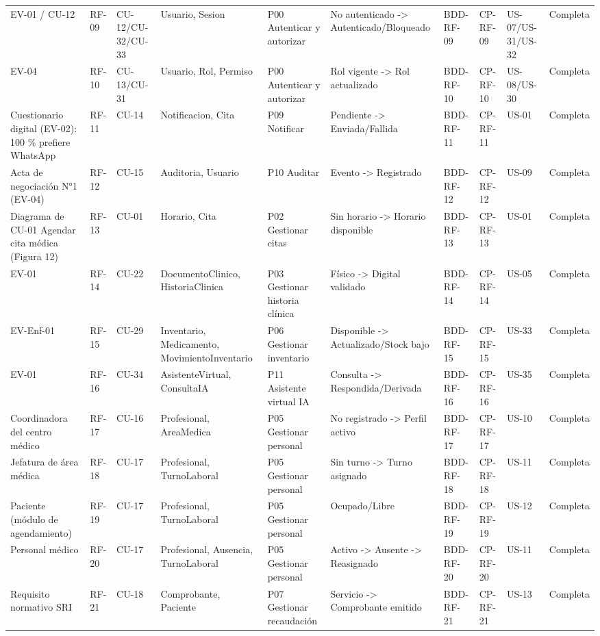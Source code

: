\documentclass[11pt,a4paper]{article}
\begin{document}
\begin{appendices}
\begin{landscape}
\begin{longtable}{p{2.2cm}p{1.8cm}p{2cm}p{3cm}p{3cm}p{3cm}p{2cm}p{2cm}p{2cm}p{1.6cm}}
			EV-01 / CU-12 & RF-09 & CU-12/CU-32/CU-33 & Usuario, Sesion & P00 Autenticar y autorizar & No autenticado -> Autenticado/Bloqueado & BDD-RF-09 & CP-RF-09 & US-07/US-31/US-32 & Completa\\
			EV-04 & RF-10 & CU-13/CU-31 & Usuario, Rol, Permiso & P00 Autenticar y autorizar & Rol vigente -> Rol actualizado & BDD-RF-10 & CP-RF-10 & US-08/US-30 & Completa\\
			Cuestionario digital (EV-02): 100 \% prefiere WhatsApp & RF-11 & CU-14 & Notificacion, Cita & P09 Notificar & Pendiente -> Enviada/Fallida & BDD-RF-11 & CP-RF-11 & US-01 & Completa\\
			Acta de negociación N°1 (EV-04) & RF-12 & CU-15 & Auditoria, Usuario & P10 Auditar & Evento -> Registrado & BDD-RF-12 & CP-RF-12 & US-09 & Completa\\
			Diagrama de CU-01 Agendar cita médica (Figura 12) & RF-13 & CU-01 & Horario, Cita & P02 Gestionar citas & Sin horario -> Horario disponible & BDD-RF-13 & CP-RF-13 & US-01 & Completa\\
			EV-01 & RF-14 & CU-22 & DocumentoClinico, HistoriaClinica & P03 Gestionar historia clínica & Físico -> Digital validado & BDD-RF-14 & CP-RF-14 & US-05 & Completa\\
			EV-Enf-01 & RF-15 & CU-29 & Inventario, Medicamento, MovimientoInventario & P06 Gestionar inventario & Disponible -> Actualizado/Stock bajo & BDD-RF-15 & CP-RF-15 & US-33 & Completa\\
			EV-01 & RF-16 & CU-34 & AsistenteVirtual, ConsultaIA & P11 Asistente virtual IA & Consulta -> Respondida/Derivada & BDD-RF-16 & CP-RF-16 & US-35 & Completa\\
			Coordinadora del centro médico & RF-17 & CU-16 & Profesional, AreaMedica & P05 Gestionar personal & No registrado -> Perfil activo & BDD-RF-17 & CP-RF-17 & US-10 & Completa\\
			Jefatura de área médica & RF-18 & CU-17 & Profesional, TurnoLaboral & P05 Gestionar personal & Sin turno -> Turno asignado & BDD-RF-18 & CP-RF-18 & US-11 & Completa\\
			Paciente (módulo de agendamiento) & RF-19 & CU-17 & Profesional, TurnoLaboral & P05 Gestionar personal & Ocupado/Libre & BDD-RF-19 & CP-RF-19 & US-12 & Completa\\
			Personal médico & RF-20 & CU-17 & Profesional, Ausencia, TurnoLaboral & P05 Gestionar personal & Activo -> Ausente -> Reasignado & BDD-RF-20 & CP-RF-20 & US-11 & Completa\\
			Requisito normativo SRI & RF-21 & CU-18 & Comprobante, Paciente & P07 Gestionar recaudación & Servicio -> Comprobante emitido & BDD-RF-21 & CP-RF-21 & US-13 & Completa\\

\end{longtable}
\end{landscape}
\end{appendices}
\end{document}
